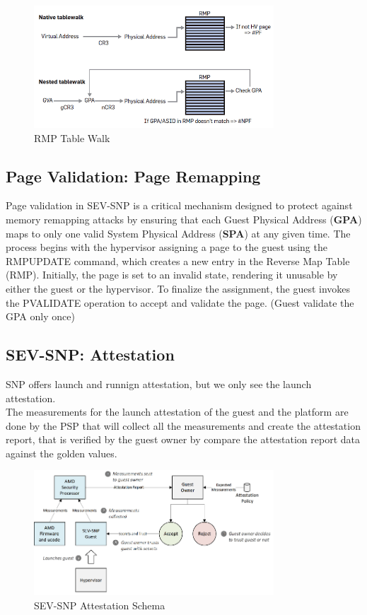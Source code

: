 \begin{figure}[h]
    \centering
    \includegraphics[width=0.8\textwidth]{img/RMP-tablewalk.png}
    \caption{RMP Table Walk}
    \label{fig:rmp_tablewalk}
\end{figure}

\subsection{Page Validation: Page Remapping}

Page validation in SEV-SNP is a critical mechanism designed to protect against memory remapping attacks by ensuring that each Guest Physical Address (\textbf{GPA}) maps to only one valid System Physical Address (\textbf{SPA}) at any given time. 
The process begins with the hypervisor assigning a page to the guest using the RMPUPDATE command, which creates a new entry in the Reverse Map Table (RMP). 
Initially, the page is set to an invalid state, rendering it unusable by either the guest or the hypervisor. 
To finalize the assignment, the guest invokes the PVALIDATE operation to accept and validate the page. (Guest validate the GPA only once)

\subsection{SEV-SNP: Attestation}

SNP offers launch and runnign attestation, but we only see the launch attestation. \\
The measurements for the launch attestation of the guest and the platform are done by the PSP that will collect all the measurements and create the attestation report, 
that is verified by the guest owner by compare the attestation report data against the golden values.

\begin{figure}[h]
    \centering
    \includegraphics[width=0.8\textwidth]{img/SNP-Attestation-schema.png}
    \caption{SEV-SNP Attestation Schema}
    \label{fig:snp_attestation}
\end{figure}

